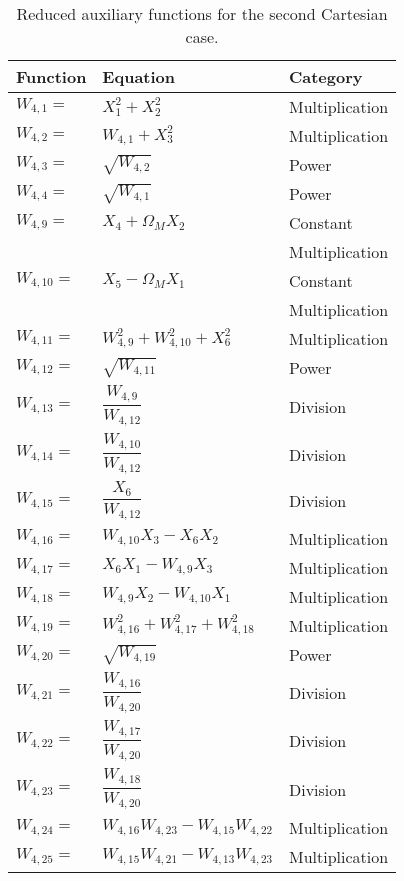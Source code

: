 \begin{longtable}{|p{1.5cm}|l|p{2cm}|}
\caption{Reduced auxiliary functions for the second Cartesian case.}
\label{tab:auxFunc2}
\endfirsthead
\endhead
\hline
\textbf{Function} & \textbf{Equation} & \textbf{Category}  \\ \hline \hline
\hline 
$W_{4,1}=$ & $ X_{1}^{2}+X_{2}^{2} $ & Multiplication \\ \hline
$W_{4,2}=$ & $ W_{4,1}+X_{3}^{2} $ & Multiplication \\ \hline
$W_{4,3}=$ & $ \sqrt{W_{4,2}} $ & Power \\ \hline
$W_{4,4}=$ & $ \sqrt{W_{4,1}} $ & Power \\ \hline
$W_{4,9}=$ & $ X_{4}+\Omega_{M}X_{2} $ & Constant  \\ 
& & Multiplication \\ \hline
$W_{4,10}=$ & $ X_{5}-\Omega_{M}X_{1} $ & Constant  \\ 
& & Multiplication \\ \hline
$W_{4,11}=$ & $ W_{4,9}^{2}+W_{4,10}^{2}+X_{6}^{2} $ & Multiplication \\ \hline
$W_{4,12}=$ & $ \sqrt{W_{4,11}} $ & Power \\ \hline
$W_{4,13}=$ & $ \dfrac{W_{4,9}}{W_{4,12}} $ & Division \\ \hline
$W_{4,14}=$ & $ \dfrac{W_{4,10}}{W_{4,12}} $ & Division \\ \hline
$W_{4,15}=$ & $ \dfrac{X_{6}}{W_{4,12}} $ & Division \\ \hline
$W_{4,16}=$ & $ W_{4,10}X_{3}-X_{6}X_{2} $ & Multiplication \\ \hline
$W_{4,17}=$ & $ X_{6}X_{1}-W_{4,9}X_{3} $ & Multiplication \\ \hline
$W_{4,18}=$ & $ W_{4,9}X_{2}-W_{4,10}X_{1} $ & Multiplication \\ \hline
$W_{4,19}=$ & $ W_{4,16}^{2}+W_{4,17}^{2}+W_{4,18}^{2} $ & Multiplication \\ \hline
$W_{4,20}=$ & $ \sqrt{W_{4,19}} $ & Power \\ \hline
$W_{4,21}=$ & $ \dfrac{W_{4,16}}{W_{4,20}} $ & Division \\ \hline
$W_{4,22}=$ & $ \dfrac{W_{4,17}}{W_{4,20}} $ & Division \\ \hline
$W_{4,23}=$ & $ \dfrac{W_{4,18}}{W_{4,20}} $ & Division \\ \hline
$W_{4,24}=$ & $ W_{4,16}W_{4,23}-W_{4,15}W_{4,22} $ & Multiplication \\ \hline
$W_{4,25}=$ & $ W_{4,15}W_{4,21}-W_{4,13}W_{4,23} $ & Multiplication \\ \hline

\end{longtable}
